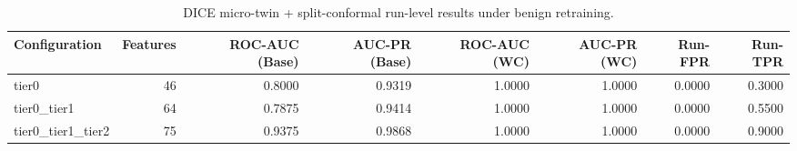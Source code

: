 \begin{table}[t]
\centering
\caption{DICE micro-twin + split-conformal run-level results under benign retraining.}
\label{tab:dice_full_overall}
\footnotesize
\begin{tabular}{lrrrrrrr}
\toprule
Configuration & Features & ROC-AUC (Base) & AUC-PR (Base) & ROC-AUC (WC) & AUC-PR (WC) & Run-FPR & Run-TPR \\
\midrule
tier0 & 46 & 0.8000 & 0.9319 & 1.0000 & 1.0000 & 0.0000 & 0.3000 \\
tier0_tier1 & 64 & 0.7875 & 0.9414 & 1.0000 & 1.0000 & 0.0000 & 0.5500 \\
tier0_tier1_tier2 & 75 & 0.9375 & 0.9868 & 1.0000 & 1.0000 & 0.0000 & 0.9000 \\
\bottomrule
\end{tabular}

\end{table}
